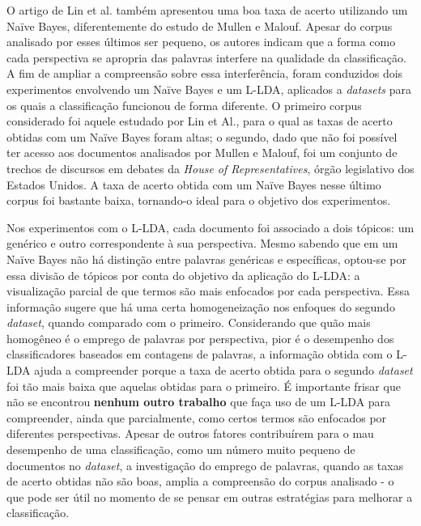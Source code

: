 O artigo de Lin et al. também apresentou uma boa taxa de acerto utilizando um Naïve Bayes, diferentemente do estudo de Mullen e Malouf. Apesar do corpus analisado por esses últimos ser pequeno, os autores indicam que a forma como cada perspectiva se apropria das palavras interfere na qualidade da classificação.  A fim de ampliar a compreensão sobre essa interferência, foram conduzidos dois experimentos envolvendo um Naïve Bayes e um L-LDA, aplicados a \emph{datasets} para os quais a classificação funcionou de forma diferente. O primeiro corpus considerado foi aquele estudado por Lin et Al., para o qual as taxas de acerto obtidas com um Naïve Bayes foram altas; o segundo, dado que não foi possível ter acesso aos documentos analisados por Mullen e Malouf, foi um conjunto de trechos de discursos em debates da \emph{House of Representatives}, órgão legislativo dos Estados Unidos. A taxa de acerto obtida com um Naïve Bayes nesse último corpus foi bastante baixa, tornando-o ideal para o objetivo dos experimentos. 

Nos experimentos com o L-LDA, cada documento foi associado a dois tópicos: um genérico e outro correspondente à sua perspectiva. Mesmo sabendo que em um Naïve Bayes não há distinção entre palavras genéricas e específicas, optou-se por essa divisão de tópicos por conta do objetivo da aplicação do L-LDA: a visualização parcial de que termos são mais enfocados por cada perspectiva. Essa informação sugere que há uma certa homogeneização nos enfoques do segundo \emph{dataset}, quando comparado com o primeiro. Considerando que quão mais homogêneo é o emprego de palavras por perspectiva, pior é o desempenho dos classificadores baseados em contagens de palavras, a informação obtida com o L-LDA ajuda a compreender porque a taxa de acerto obtida para o segundo \emph{dataset} foi tão mais baixa que aquelas obtidas para o primeiro. É importante frisar que não se encontrou \textbf{nenhum outro trabalho} que faça uso de um L-LDA para compreender, ainda que parcialmente, como certos termos são enfocados por diferentes perspectivas. Apesar de outros fatores contribuírem para o mau desempenho de uma classificação, como um número muito pequeno de documentos no \emph{dataset}, a investigação do emprego de palavras, quando as taxas de acerto obtidas não são boas, amplia a compreensão do corpus analisado - o que pode ser útil no momento de se pensar em outras estratégias para melhorar a classificação.  


